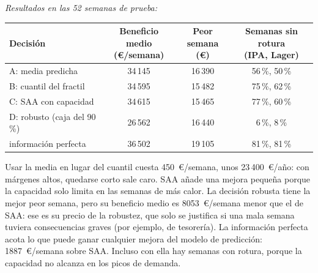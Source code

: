 \begin{ejemplo}
\emph{Resultados en las 52 semanas de prueba:}
\begin{center}\small
\begin{tabular}{@{}lccc@{}}
\toprule
Decisión & \makecell{Beneficio medio\\(€/semana)} & \makecell{Peor\\semana (€)} & \makecell{Semanas sin rotura\\(IPA, Lager)} \\
\midrule
A: media predicha & 34\,145 & 16\,390 & 56\,\%, 50\,\% \\
B: cuantil del fractil & 34\,595 & 15\,482 & 75\,\%, 62\,\% \\
C: SAA con capacidad & 34\,615 & 15\,465 & 77\,\%, 60\,\% \\
D: robusto (caja del 90\,\%) & 26\,562 & 16\,440 & 6\,\%, 8\,\% \\
información perfecta & 36\,502 & 19\,105 & 81\,\%, 81\,\% \\
\bottomrule
\end{tabular}
\end{center}
Usar la media en lugar del cuantil cuesta 450~€/semana, unos 23\,400~€/año: con márgenes altos, quedarse corto sale caro. SAA añade una mejora pequeña porque la capacidad solo limita en las semanas de más calor. La decisión robusta tiene la mejor peor semana, pero su beneficio medio es 8053~€/semana menor que el de SAA: ese es su precio de la robustez, que solo se justifica si una mala semana tuviera consecuencias graves (por ejemplo, de tesorería). La información perfecta acota lo que puede ganar cualquier mejora del modelo de predicción: 1887~€/semana sobre SAA. Incluso con ella hay semanas con rotura, porque la capacidad no alcanza en los picos de demanda.
\end{ejemplo}

